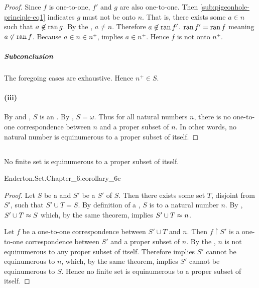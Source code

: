 \documentclass{report}
\begin{document}
\begin{proof}
        Since $f$ is one-to-one, $f'$ and $g$ are also one-to-one.
        Then \eqref{sub:pigeonhole-principle-eq1} indicates $g$ must not be onto
          $n$.
        That is, there exists some $a \in n$ such that $a \not\in \mathop{\text{ran}}{g}$.
        By the , $a \neq n$.
        Therefore $a \not\in \mathop{\text{ran}}{f'}$.
        $\mathop{\text{ran}}{f'} = \mathop{\text{ran}}{f}$ meaning $a \not\in \mathop{\text{ran}}{f}$.
        Because $a \in n \in n^+$,  implies $a \in n^+$.
        Hence $f$ is not onto $n^+$.

      \subparagraph{Subconclusion}%

        The foregoing cases are exhaustive.
        Hence $n^+ \in S$.

    \paragraph{(iii)}%

      By  and
        , $S$ is an
        .
      By , $S = \omega$.
      Thus for all natural numbers $n$, there is no one-to-one correspondence
        between $n$ and a proper subset of $n$.
      In other words, no natural number is equinumerous to a proper subset of
        itself.

  \end{proof}

\subsection{}%

  \begin{corollary}[6C]
    No finite set is equinumerous to a proper subset of itself.
  \end{corollary}

    {Enderton.Set.Chapter\_6.corollary\_6c}

  \begin{proof}
    Let $S$ be a  and $S'$ be a
       $S'$ of $S$.
    Then there exists some set $T$, disjoint from $S'$, such that
      $S' \cup T = S$.
    By definition of a , $S$ is
       to a natural number $n$.
    By , $S' \cup T \approx S$ which, by the
      same theorem, implies $S' \cup T \approx n$.

    Let $f$ be a one-to-one correspondence between $S' \cup T$ and $n$.
    Then $f \restriction S'$ is a one-to-one correspondence between $S'$ and a
      proper subset of $n$.
    By the , $n$ is not equinumerous to any
      proper subset of itself.
    Therefore  implies $S'$ cannot be equinumerous to
      $n$, which, by the same theorem, implies $S'$ cannot be equinumerous to
      $S$.
    Hence no finite set is equinumerous to a proper subset of itself.
  \end{proof}
\end{document}
